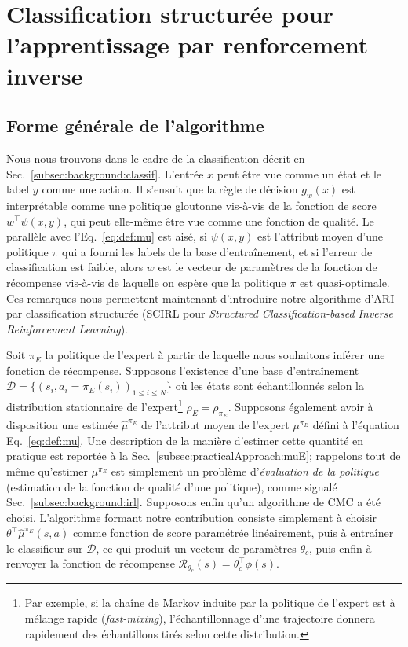 \documentclass[english,utf8]{./hermes-journal}
\newcommand{\R}{\mathcal{R}}
\newcommand{\D}{\mathcal{D}}
\begin{document}
\section{Classification structurée pour l'apprentissage par renforcement inverse} \label{sec:scirl}

\subsection{Forme générale de l'algorithme}
\label{subsec:scirl:algo}

Nous nous trouvons dans le cadre de la classification décrit en Sec.~\ref{subsec:background:classif}. L'entrée $x$ peut être vue comme un état et le label $y$ comme une action. Il s'ensuit que la règle de décision 
$g_w(x)$ est interprétable comme une politique gloutonne vis-à-vis de la fonction de score $w^\top \psi(x,y)$, qui peut elle-même être vue comme une fonction de qualité. Le parallèle avec l'Eq.~\eqref{eq:def:mu} est aisé, si $\psi(x,y)$ est l'attribut moyen d'une politique $\pi$ qui a fourni les labels de la base d'entraînement, et si l'erreur de classification est faible, alors $w$ est le vecteur de paramètres de la fonction de récompense vis-à-vis de laquelle on espère que la politique $\pi$ est quasi-optimale. 
Ces remarques nous permettent maintenant d'introduire notre algorithme d'ARI par classification structurée (SCIRL pour \emph{Structured Classification-based Inverse Reinforcement Learning}).

Soit $\pi_E$ la politique de l'expert à partir de laquelle nous souhaitons inférer une fonction de récompense. Supposons l'existence d'une base d'entraînement $\D = \{(s_i,a_i=\pi_E(s_i))_{1\leq i\leq N}\}$ où les états sont échantillonnés selon la distribution stationnaire de l'expert\footnote{Par exemple, si la chaîne de Markov induite par la politique de l'expert est à mélange rapide (\emph{fast-mixing}), l'échantillonnage d'une trajectoire donnera rapidement des échantillons tirés selon cette distribution.} $\rho_E = \rho_{\pi_E}$.
Supposons également avoir à disposition une estimée $\hat{\mu}^{\pi_E}$ de l'attribut moyen de l'expert $\mu^{\pi_E}$ défini à l'équation Eq.~\eqref{eq:def:mu}. Une description de la manière d'estimer cette quantité en pratique est reportée à la Sec.~\ref{subsec:practicalApproach:muE}; rappelons tout de même qu'estimer $\mu^{\pi_E}$ est simplement un problème d'\emph{évaluation de la politique} (estimation de la fonction de qualité d'une politique), comme signalé Sec.~\ref{subsec:background:irl}. Supposons enfin qu'un algorithme de CMC a été choisi. L'algorithme formant notre contribution consiste simplement à choisir $\theta^\top\hat{\mu}^{\pi_E}(s,a)$ comme fonction de score paramétrée linéairement, puis à entraîner le classifieur sur $\D$, ce qui produit un vecteur de paramètres $\theta_c$, puis enfin à renvoyer la fonction de récompense $\R_{\theta_c}(s) = \theta_c^\top \phi(s)$.
\end{document}
